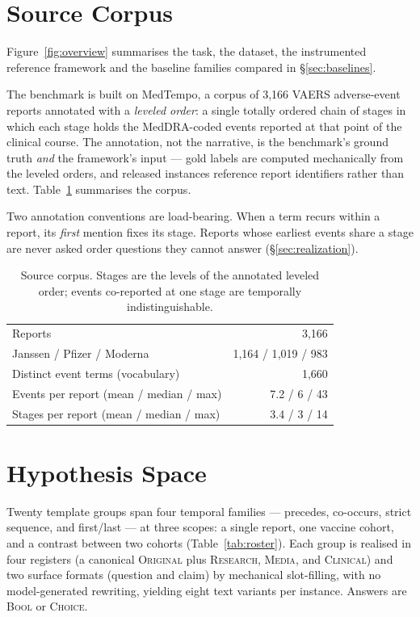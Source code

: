 \section{Source Corpus}
\label{sec:corpus}

Figure~\ref{fig:overview} summarises the task, the dataset, the instrumented
reference framework and the baseline families compared in \S\ref{sec:baselines}.

The benchmark is built on MedTempo, a corpus of 3{,}166 VAERS adverse-event
reports annotated with a \emph{leveled order}: a single totally ordered chain of
stages in which each stage holds the MedDRA-coded events reported at that point
of the clinical course. The annotation, not the narrative, is the benchmark's
ground truth \emph{and} the framework's input --- gold labels are computed
mechanically from the leveled orders, and released instances reference report
identifiers rather than text. Table~\ref{tab:corpus} summarises the corpus.

Two annotation conventions are load-bearing. When a term recurs within a report,
its \emph{first} mention fixes its stage. Reports whose earliest events share a
stage are never asked order questions they cannot answer
(\S\ref{sec:realization}).

\begin{table}[t]
\centering
\small
\begin{tabular}{lr}
\toprule
Reports & 3{,}166 \\
\quad Janssen / Pfizer / Moderna & 1{,}164 / 1{,}019 / 983 \\
Distinct event terms (vocabulary) & 1{,}660 \\
Events per report (mean / median / max) & 7.2 / 6 / 43 \\
Stages per report (mean / median / max) & 3.4 / 3 / 14 \\
\bottomrule
\end{tabular}
\caption{Source corpus. Stages are the levels of the annotated leveled order;
events co-reported at one stage are temporally indistinguishable.}
\label{tab:corpus}
\end{table}

\section{Hypothesis Space}
\label{sec:space}

Twenty template groups span four temporal families --- precedes, co-occurs,
strict sequence, and first/last --- at three scopes: a single report, one vaccine
cohort, and a contrast between two cohorts (Table~\ref{tab:roster}). Each group
is realised in four registers (a canonical \textsc{Original} plus
\textsc{Research}, \textsc{Media}, and \textsc{Clinical}) and two surface formats
(question and claim) by mechanical slot-filling, with no model-generated
rewriting, yielding eight text variants per instance. Answers are \textsc{Bool}
or \textsc{Choice}.

